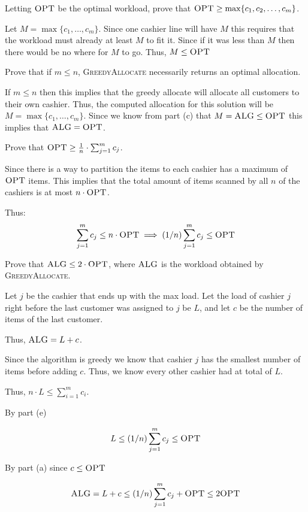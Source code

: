 \documentclass[12pt, letterpaper]{article}
\begin{document}
\begin{subproblem}{}
    Letting $\textsc{OPT}$ be the optimal workload, prove that $\textsc{OPT} \geq \max \{c_1, c_2, \ldots, c_m\}$.
\end{subproblem}
\begin{problemproof}
    Let $M = \max\{c_1,\dots,c_m\}$. Since one cashier line will have $M$ this requires that the workload must already at least $M$ to fit it. Since if it was less than $M$ then there would be no where for $M$ to go. Thus, $M \leq \textsc{OPT}$
\end{problemproof}

\begin{subproblem}{}
    Prove that if $m \leq n$, \textsc{GreedyAllocate} necessarily returns an optimal allocation.
\end{subproblem}
\begin{problemproof}
    If $m \leq n$ then this implies that the greedy allocate will allocate all customers to their own cashier. Thus, the computed allocation for this solution will be $M=\max\{c_1,\dots,c_m\}$. Since we know from part (c) that $M=\textsc{ALG} \leq \textsc{OPT}$ this implies that $\textsc{ALG} = \textsc{OPT}$.
\end{problemproof}

\begin{subproblem}{}
    Prove that $\textsc{OPT} \geq \frac{1}{n} \cdot \sum_{j=1}^{m} c_j$.
\end{subproblem}
\begin{problemproof}
    Since there is a way to partition the items to each cashier has a maximum of $\textsc{OPT}$ items. This implies that the total amount of items scanned by all $n$ of the cashiers is at most $n \cdot \textsc{OPT}$.

    Thus:
    \[\sum_{j=1}^m c_j \leq n \cdot \textsc{OPT} \implies (1/n) \sum_{j=1}^m c_j \leq \textsc{OPT}\]
\end{problemproof}

\begin{subproblem}{}
    Prove that $\textsc{ALG} \leq 2\cdot \textsc{OPT}$, where $\textsc{ALG}$ is the workload obtained by \textsc{GreedyAllocate}.
\end{subproblem}
\begin{problemproof}
    Let $j$ be the cashier that ends up with the max load. Let the load of cashier $j$ right before the last customer was assigned to $j$ be $L$, and let $c$ be the number of items of the last customer.

    Thus, $\textsc{ALG} = L + c$.

    Since the algorithm is greedy we know that cashier $j$ has the smallest number of items before adding $c$. Thus, we know every other cashier had at total of $L$.

    Thus, $n \cdot L \leq \sum_{i=1}^m c_i$.

    By part (e)

    \[L \leq (1/n) \sum_{j=1}^m c_j \leq \textsc{OPT}\]

    By part (a) since $c \leq \textsc{OPT}$

    \[\textsc{ALG} = L + c \leq (1/n) \sum_{j=1}^m c_j + \textsc{OPT} \leq 2 \textsc{OPT}\]
\end{problemproof}
\end{document}
